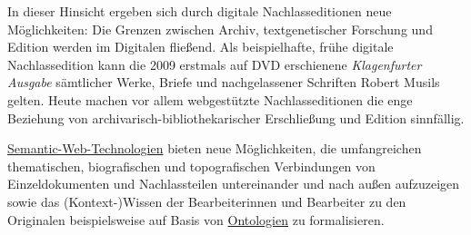 \documentclass{article}
\begin{document}
        In dieser Hinsicht ergeben sich durch digitale Nachlasseditionen neue
                  Möglichkeiten: Die Grenzen zwischen Archiv, textgenetischer Forschung und Edition
                  werden im Digitalen fließend. Als beispielhafte, frühe digitale Nachlassedition
                  kann die 2009 erstmals auf DVD erschienene \emph{Klagenfurter
                     Ausgabe} sämtlicher Werke, Briefe und nachgelassener Schriften Robert
                  Musils gelten. Heute machen vor allem webgestützte Nachlasseditionen die enge
                  Beziehung von archivarisch-bibliothekarischer Erschließung und Edition sinnfällig.
                     
                  \href{http://gams.uni-graz.at/o:konde.168}{Semantic-Web-Technologien} bieten neue
                  Möglichkeiten, die umfangreichen thematischen, biografischen und topografischen
                  Verbindungen von Einzeldokumenten und Nachlassteilen untereinander und nach außen
                  aufzuzeigen sowie das (Kontext-)Wissen der Bearbeiterinnen und Bearbeiter zu den
                  Originalen beispielsweise auf Basis von \href{http://gams.uni-graz.at/o:konde.151}{Ontologien} zu formalisieren. \\
            
\end{document}
